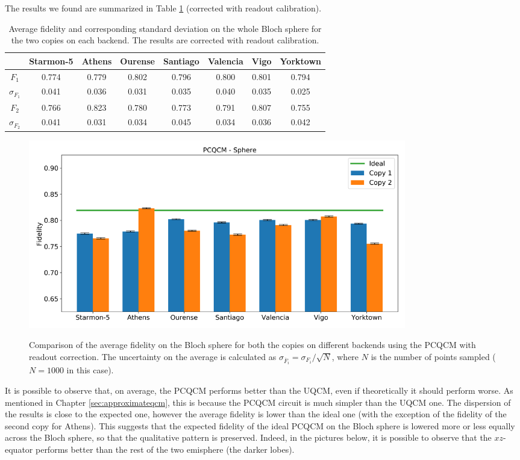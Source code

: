 The results we found are summarized in Table \ref{tab:results_pcqcm_fullsphere_corrected} (corrected with readout calibration).
\begin{table}[H]
    \centering
    \begin{tabular}{|c|c|c|c|c|c|c|c|}
    \hline
    \textbf{} & \textbf{Starmon-5} & \textbf{Athens} & \textbf{Ourense} & \textbf{Santiago} & \textbf{Valencia} & \textbf{Vigo} & \textbf{Yorktown} \\ \hline
    $F_1$              & 0.774 & 0.779 & 0.802 & 0.796 & 0.800 & 0.801 & 0.794 \\ \hline
    $\sigma_{F_1}$     & 0.041 & 0.036 & 0.031 & 0.035 & 0.040 & 0.035 & 0.025 \\ \hline
    $F_2$              & 0.766 & 0.823 & 0.780 & 0.773 & 0.791 & 0.807 & 0.755 \\ \hline
    $\sigma_{F_2}$     & 0.041 & 0.031 & 0.034 & 0.045 & 0.034 & 0.036 & 0.042 \\ \hline
    \end{tabular}
    \caption{Average fidelity and corresponding standard deviation on the whole Bloch sphere for the two copies on each backend. The results are corrected with readout calibration.}
    \label{tab:results_pcqcm_fullsphere_corrected}
\end{table}
\begin{figure}[H]
  \centering
          \includegraphics[width=0.8\textwidth]{Figures/PhaseCovariant/Histograms/histo_sphere_corrected.png}
      \label{fig:pc_histo_sphere_corrected}
      \caption{Comparison of the average fidelity on the Bloch sphere for both the copies on different backends using the PCQCM with readout correction. The uncertainty on the average is calculated as $\sigma_{\overline{F}_i}=\sigma_{F_i}/\sqrt{N}$, where $N$ is the number of points sampled ($N=1000$ in this case).}
\end{figure}

It is possible to observe that, on average, the PCQCM performs better than the UQCM, even if theoretically it should perform worse. 
As mentioned in Chapter \ref{sec:approximateqcm}, this is because the PCQCM circuit is much simpler than the UQCM one.
The dispersion of the results is close to the expected one, however the average fidelity is lower than the ideal one (with the exception of the fidelity of the second copy for Athens).
This suggests that the expected fidelity of the ideal PCQCM on the Bloch sphere is lowered more or less equally across the Bloch sphere, so that the qualitative pattern is preserved.
Indeed, in the pictures below, it is possible to observe that the $xz$-equator performs better than the rest of the two emisphere (the darker lobes).


